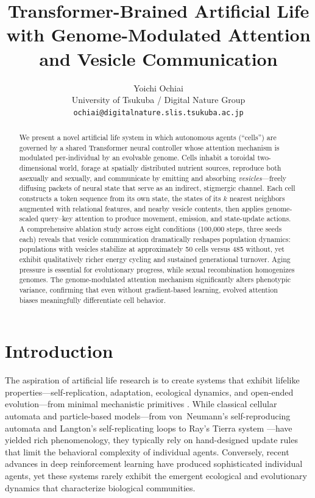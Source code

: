 \documentclass[10pt,twocolumn]{article}
\title{Transformer-Brained Artificial Life with Genome-Modulated Attention and Vesicle Communication}
\author{
  Yoichi Ochiai \\
  University of Tsukuba / Digital Nature Group \\
  \texttt{ochiai@digitalnature.slis.tsukuba.ac.jp}
}
\date{}
\begin{document}
\maketitle

\begin{abstract}
We present a novel artificial life system in which autonomous agents (``cells'') are governed by a shared Transformer neural controller whose attention mechanism is modulated per-individual by an evolvable genome.
Cells inhabit a toroidal two-dimensional world, forage at spatially distributed nutrient sources, reproduce both asexually and sexually, and communicate by emitting and absorbing \emph{vesicles}---freely diffusing packets of neural state that serve as an indirect, stigmergic channel.
Each cell constructs a token sequence from its own state, the states of its $k$ nearest neighbors augmented with relational features, and nearby vesicle contents, then applies genome-scaled query--key attention to produce movement, emission, and state-update actions.
A comprehensive ablation study across eight conditions (100{,}000 steps, three seeds each) reveals that vesicle communication dramatically reshapes population dynamics: populations with vesicles stabilize at approximately 50 cells versus 485 without, yet exhibit qualitatively richer energy cycling and sustained generational turnover.
Aging pressure is essential for evolutionary progress, while sexual recombination homogenizes genomes.
The genome-modulated attention mechanism significantly alters phenotypic variance, confirming that even without gradient-based learning, evolved attention biases meaningfully differentiate cell behavior.
\end{abstract}

\section{Introduction}
\label{sec:intro}

The aspiration of artificial life research is to create systems that exhibit lifelike properties---self-replication, adaptation, ecological dynamics, and open-ended evolution---from minimal mechanistic primitives \cite{langton1990computation,packard2019overview,taylor2016open,bedau2003artificial}.
While classical cellular automata and particle-based models---from von~Neumann's self-reproducing automata \cite{vonneumann1966theory} and Langton's self-replicating loops \cite{langton1984self} to Ray's Tierra system \cite{ray1991approach}---have yielded rich phenomenology, they typically rely on hand-designed update rules that limit the behavioral complexity of individual agents.
Conversely, recent advances in deep reinforcement learning \cite{lowe2017multi} have produced sophisticated individual agents, yet these systems rarely exhibit the emergent ecological and evolutionary dynamics that characterize biological communities.
\end{document}
